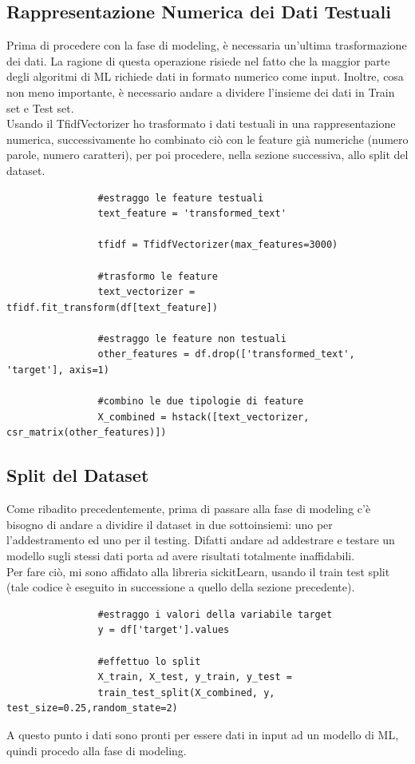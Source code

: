 \documentclass[]{article}
\begin{document}
        \subsection{Rappresentazione Numerica dei Dati Testuali}
            Prima di procedere con la fase di modeling, è necessaria un'ultima trasformazione dei dati. La ragione di questa operazione risiede nel fatto che la maggior parte degli algoritmi di ML richiede dati in formato numerico come input. Inoltre, cosa non meno importante, è necessario andare a dividere l'insieme dei dati in Train set e Test set.\\
            Usando il TfidfVectorizer ho trasformato i dati testuali in una rappresentazione numerica, successivamente ho combinato ciò con le feature già numeriche (numero parole, numero caratteri), per poi procedere, nella sezione successiva, allo split del dataset.
            \begin{verbatim}
                #estraggo le feature testuali
                text_feature = 'transformed_text'

                tfidf = TfidfVectorizer(max_features=3000)

                #trasformo le feature
                text_vectorizer = tfidf.fit_transform(df[text_feature])

                #estraggo le feature non testuali
                other_features = df.drop(['transformed_text', 'target'], axis=1)

                #combino le due tipologie di feature
                X_combined = hstack([text_vectorizer, csr_matrix(other_features)])
            \end{verbatim}

        \subsection{Split del Dataset}
            Come ribadito precedentemente, prima di passare alla fase di modeling c'è bisogno di andare a dividire il dataset in due sottoinsiemi: uno per l'addestramento ed uno per il testing. Difatti andare ad addestrare e testare un modello sugli stessi dati porta ad avere risultati totalmente inaﬃdabili.\\
            Per fare ciò, mi sono affidato alla libreria sickitLearn, usando il train test split (tale codice è eseguito in successione a quello della sezione precedente).
            \begin{verbatim}
                #estraggo i valori della variabile target
                y = df['target'].values

                #effettuo lo split
                X_train, X_test, y_train, y_test =
                train_test_split(X_combined, y, test_size=0.25,random_state=2)
            \end{verbatim}
            A questo punto i dati sono pronti per essere dati in input ad un modello di ML, quindi procedo alla fase di modeling.
\end{document}
